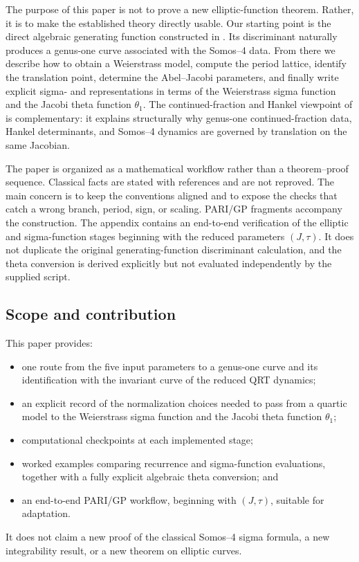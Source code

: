 \documentclass[11pt]{article}
\newcommand{\taupar}{\tau}
\begin{document}
The purpose of this paper is not to prove a new elliptic-function theorem.
Rather, it is to make the established theory directly usable. Our starting
point is the direct algebraic generating function constructed in
\cite{Scheuerle2026}. Its discriminant naturally produces a genus-one curve
associated with the Somos--4 data. From there we describe how to obtain a
Weierstrass model, compute the period lattice, identify the translation point,
determine the Abel--Jacobi parameters, and finally write explicit sigma- and
representations in terms of the Weierstrass sigma function and the Jacobi
theta function $\theta_1$. The continued-fraction and Hankel viewpoint of
\cite{Hone2020} is complementary: it explains structurally why genus-one
continued-fraction data, Hankel determinants, and Somos--4 dynamics are
governed by translation on the same Jacobian.

The paper is organized as a mathematical workflow rather than a
theorem--proof sequence. Classical facts are stated with references and are
not reproved. The main concern is to keep the conventions aligned and to
expose the checks that catch a wrong branch, period, sign, or scaling.
PARI/GP fragments accompany the construction. The appendix contains an
end-to-end verification of the elliptic and sigma-function stages beginning
with the reduced parameters $(J,\taupar)$. It does not duplicate the original
generating-function discriminant calculation, and the theta conversion is
derived explicitly but not evaluated independently by the supplied script.

\subsection{Scope and contribution}
This paper provides:
\begin{itemize}[leftmargin=2em]
  \item one route from the five input parameters to a genus-one curve and its
        identification with the invariant curve of the reduced QRT dynamics;
  \item an explicit record of the normalization choices needed to pass from
        a quartic model to the Weierstrass sigma function and the Jacobi theta
        function $\theta_1$;
  \item computational checkpoints at each implemented stage;
  \item worked examples comparing recurrence and sigma-function evaluations,
        together with a fully explicit algebraic theta conversion; and
  \item an end-to-end PARI/GP workflow, beginning with $(J,\taupar)$, suitable
        for adaptation.
\end{itemize}
It does not claim a new proof of the classical Somos--4 sigma formula, a new
integrability result, or a new theorem on elliptic curves.
\end{document}
